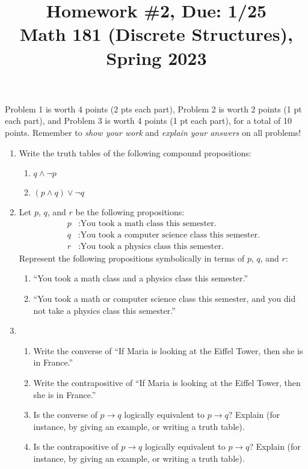 \documentclass[11pt]{article}
\title{Homework \#2, Due: 1/25 \\Math 181 (Discrete Structures), Spring 2023}
\date{}
\begin{document}
\maketitle

\thispagestyle{empty}

\vspace{-1cm}

Problem 1 is worth 4 points (2 pts each part), Problem 2 is worth 2 points (1 pt each part), and Problem 3 is worth 4 points (1 pt each part), for a total of 10 points. Remember to \emph{show your work} and \emph{explain your answers} on all problems!

\begin{enumerate}
\item Write the truth tables of the following compound propositions:
\begin{enumerate}
\item $q \wedge \neg p$
\item $(p \wedge q) \vee \neg q$
\end{enumerate}

\item Let $p$, $q$, and $r$ be the following propositions:
\begin{align*}
p &: \textrm{You took a math class this semester.} \\
q &: \textrm{You took a computer science class this semester.} \\
r &: \textrm{You took a physics class this semester.}
\end{align*}
Represent the following propositions symbolically in terms of $p$, $q$, and $r$:
\begin{enumerate}
\item ``You took a math class and a physics class this semester.''
\item ``You took a math or computer science class this semester, and you did not take a physics class this semester.''
\end{enumerate}

\item \begin{enumerate}
\item Write the converse of ``If Maria is looking at the Eiffel Tower, then she is in France.''
\item Write the contrapositive of ``If Maria is looking at the Eiffel Tower, then she is in France.''
\item Is the converse of $p \to q$ logically equivalent to $p \to q$? Explain (for instance, by giving an example, or writing a truth table).
\item Is the contrapositive of $p \to q$ logically equivalent to $p \to q$? Explain (for instance, by giving an example, or writing a truth table).
\end{enumerate}
\end{enumerate}
\end{document}

